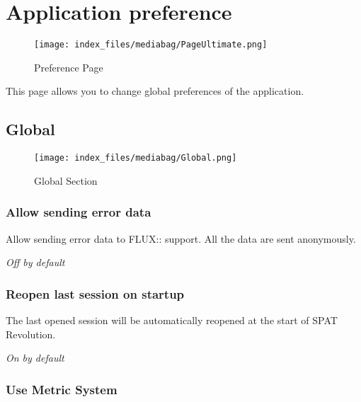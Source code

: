 \documentclass[
  letterpaper,
  DIV=11,
  numbers=noendperiod]{scrreport}
\begin{document}
\hypertarget{application-preference}{%
\chapter{Application preference}\label{application-preference}}

\begin{figure}

{\centering \texttt{[image: index\_files/mediabag/PageUltimate.png]}

}

\caption{Preference Page}

\end{figure}

This page allows you to change global preferences of the application.

\hypertarget{global}{%
\section{Global}\label{global}}

\begin{figure}

{\centering \texttt{[image: index\_files/mediabag/Global.png]}

}

\caption{Global Section}

\end{figure}

\hypertarget{allow-sending-error-data}{%
\subsection{Allow sending error data}\label{allow-sending-error-data}}

Allow sending error data to FLUX:: support. All the data are sent
anonymously.

\emph{Off by default}

\hypertarget{reopen-last-session-on-startup}{%
\subsection{Reopen last session on
startup}\label{reopen-last-session-on-startup}}

The last opened session will be automatically reopened at the start of
SPAT Revolution.

\emph{On by default}

\hypertarget{use-metric-system}{%
\subsection{Use Metric System}\label{use-metric-system}}
\end{document}
